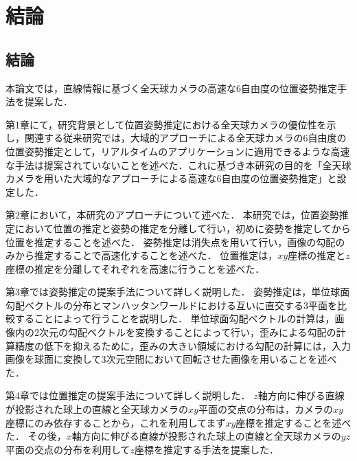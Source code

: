 \chapter{結論}
\thispagestyle{empty}
\label{chap6}
\minitoc

\newpage
\section{結論}

本論文では，直線情報に基づく全天球カメラの高速な6自由度の位置姿勢推定手法を提案した．
\vspace{\baselineskip}

第1章にて，研究背景として位置姿勢推定における全天球カメラの優位性を示し，関連する従来研究では，大域的アプローチによる全天球カメラの6自由度の位置姿勢推定として，リアルタイムのアプリケーションに適用できるような高速な手法は提案されていないことを述べた．これに基づき本研究の目的を「全天球カメラを用いた大域的なアプローチによる高速な6自由度の位置姿勢推定」と設定した．
\vspace{\baselineskip}

第2章において，本研究のアプローチについて述べた．
本研究では，位置姿勢推定において位置の推定と姿勢の推定を分離して行い，初めに姿勢を推定してから位置を推定することを述べた．
姿勢推定は消失点を用いて行い，画像の勾配のみから推定することで高速化することを述べた．
位置推定は，$xy$座標の推定と$z$座標の推定を分離してそれぞれを高速に行うことを述べた．
\vspace{\baselineskip}

第3章では姿勢推定の提案手法について詳しく説明した．
姿勢推定は，単位球面勾配ベクトルの分布とマンハッタンワールドにおける互いに直交する3平面を比較することによって行うことを説明した．
単位球面勾配ベクトルの計算は，画像内の2次元の勾配ベクトルを変換することによって行い，歪みによる勾配の計算精度の低下を抑えるために，歪みの大きい領域における勾配の計算には，入力画像を球面に変換して3次元空間において回転させた画像を用いることを述べた．
\vspace{\baselineskip}

第4章では位置推定の提案手法について詳しく説明した．
$z$軸方向に伸びる直線が投影された球上の直線と全天球カメラの$xy$平面の交点の分布は，カメラの$xy$座標にのみ依存することから，これを利用してまず$xy$座標を推定することを述べた．
その後，$x$軸方向に伸びる直線が投影された球上の直線と全天球カメラの$yz$平面の交点の分布を利用して$z$座標を推定する手法を提案した．
\vspace{\baselineskip}

